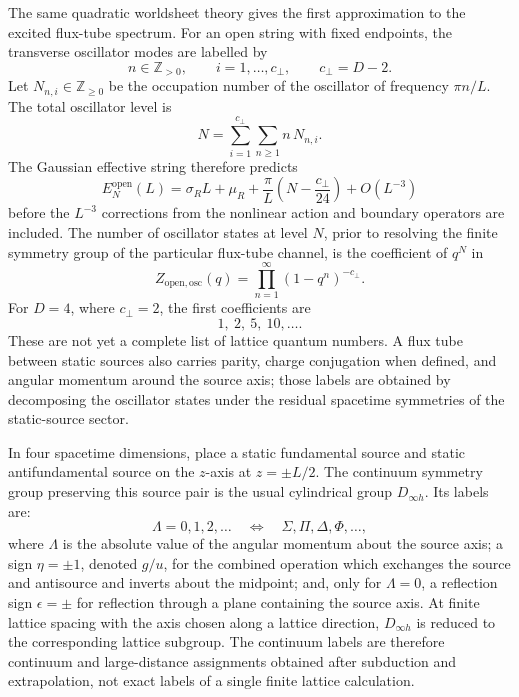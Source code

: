 The same quadratic worldsheet theory gives the first approximation to the
excited flux-tube spectrum.  For an open string with fixed endpoints, the
transverse oscillator modes are labelled by
\[
  n\in\mathbb Z_{>0},\qquad i=1,\ldots,c_\perp ,
  \qquad c_\perp=D-2 .
\]
Let \(N_{n,i}\in\mathbb Z_{\ge0}\) be the occupation number of the oscillator
of frequency \(\pi n/L\).  The total oscillator level is
\begin{equation}
  N=\sum_{i=1}^{c_\perp}\sum_{n\ge1}n\,N_{n,i}.
  \label{eq:qcd-string-open-oscillator-level}
\end{equation}
The Gaussian effective string therefore predicts
\begin{equation}
  E_N^{\mathrm{open}}(L)
  =
  \sigma_RL+\mu_R
  +
  \frac{\pi}{L}
  \left(
    N-\frac{c_\perp}{24}
  \right)
  +O(L^{-3})
  \label{eq:qcd-string-open-gaussian-levels}
\end{equation}
before the \(L^{-3}\) corrections from the nonlinear action and boundary
operators are included.  The number of oscillator states at level \(N\), prior
to resolving the finite symmetry group of the particular flux-tube channel, is
the coefficient of \(q^N\) in
\begin{equation}
  Z_{\mathrm{open,osc}}(q)
  =
  \prod_{n=1}^{\infty}(1-q^n)^{-c_\perp}.
  \label{eq:qcd-string-open-oscillator-generating}
\end{equation}
For \(D=4\), where \(c_\perp=2\), the first coefficients are
\[
  1,\ 2,\ 5,\ 10,\ldots .
\]
These are not yet a complete list of lattice quantum numbers.  A flux tube
between static sources also carries parity, charge conjugation when defined,
and angular momentum around the source axis; those labels are obtained by
decomposing the oscillator states under the residual spacetime symmetries of
the static-source sector.

In four spacetime dimensions, place a static fundamental source and static
antifundamental source on the \(z\)-axis at \(z=\pm L/2\).  The continuum
symmetry group preserving this source pair is the usual cylindrical group
\(D_{\infty h}\).  Its labels are:
\[
  \Lambda=0,1,2,\ldots
  \quad\Longleftrightarrow\quad
  \Sigma,\Pi,\Delta,\Phi,\ldots ,
\]
where \(\Lambda\) is the absolute value of the angular momentum about the
source axis; a sign
\(\eta=\pm1\), denoted \(g/u\), for the combined operation which exchanges the
source and antisource and inverts about the midpoint; and, only for
\(\Lambda=0\), a reflection sign \(\epsilon=\pm\) for reflection through a
plane containing the source axis.  At finite lattice spacing with the axis
chosen along a lattice direction, \(D_{\infty h}\) is reduced to the
corresponding lattice subgroup.  The continuum labels are therefore continuum
and large-distance assignments obtained after subduction and extrapolation,
not exact labels of a single finite lattice calculation.


